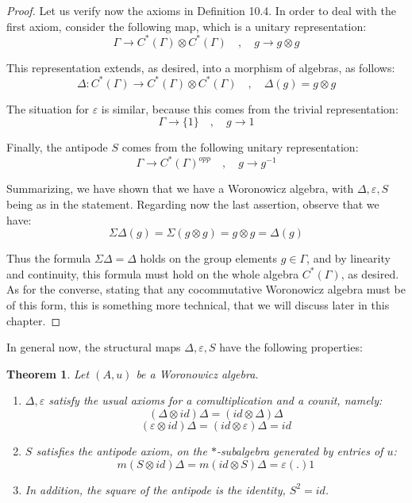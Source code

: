 \documentclass[12pt]{amsbook}
\newtheorem{theorem}{Theorem}[chapter]
\begin{document}
\begin{proof}
Let us verify now the axioms in Definition 10.4. In order to deal with the first axiom, consider the following map, which is a unitary representation:
$$\Gamma\to C^*(\Gamma)\otimes C^*(\Gamma)\quad,\quad 
g\to g\otimes g$$

This representation extends, as desired, into a morphism of algebras, as follows:
$$\Delta:C^*(\Gamma)\to C^*(\Gamma)\otimes C^*(\Gamma)\quad,\quad 
\Delta(g)=g\otimes g$$

The situation for $\varepsilon$ is similar, because this comes from the trivial representation:
$$\Gamma\to\{1\}\quad,\quad 
g\to1$$

Finally, the antipode $S$ comes from the following unitary representation:
$$\Gamma\to C^*(\Gamma)^{opp}\quad,\quad 
g\to g^{-1}$$

Summarizing, we have shown that we have a Woronowicz algebra, with $\Delta,\varepsilon,S$ being as in the statement. Regarding now the last assertion, observe that we have:
$$\Sigma\Delta(g)
=\Sigma(g\otimes g)
=g\otimes g
=\Delta(g)$$

Thus the formula $\Sigma\Delta=\Delta$ holds on the group elements $g\in\Gamma$, and by linearity and continuity, this formula must hold on the whole algebra $C^*(\Gamma)$, as desired. As for the converse, stating that any cocommutative Woronowicz algebra must be of this form, this is something more technical, that we will discuss later in this chapter.
\end{proof}

In general now, the structural maps $\Delta,\varepsilon,S$ have the following properties:


\begin{theorem}
Let $(A,u)$ be a Woronowicz algebra.
\begin{enumerate} 
\item $\Delta,\varepsilon$ satisfy the usual axioms for a comultiplication and a counit, namely:
$$(\Delta\otimes id)\Delta=(id\otimes \Delta)\Delta$$
$$(\varepsilon\otimes id)\Delta=(id\otimes\varepsilon)\Delta=id$$

\item $S$ satisfies the antipode axiom, on the $*$-subalgebra generated by entries of $u$: 
$$m(S\otimes id)\Delta=m(id\otimes S)\Delta=\varepsilon(.)1$$

\item In addition, the square of the antipode is the identity, $S^2=id$.
\end{enumerate}
\end{theorem}
\end{document}
